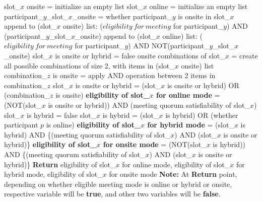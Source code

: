 \begin{algorithm}[H]
\begin{algorithmic}
            \State slot\_\(x\) onsite = initialize an empty list
            \State slot\_\(x\) online = initialize an empty list
                \State participant\_\(y\)\_slot\_\(x\)\_onsite = whether participant\_\(y\) is onsite in slot\_\(x\)
                \State append to (slot\_\(x\) onsite) list: (\(eligibility\ for\ meeting\) for participant\_\(y\)) AND (participant\_\(y\)\_slot\_\(x\)\_onsite)
                \State append to (slot\_\(x\) online) list: (\(eligibility\ for\ meeting\) for participant\_\(y\)) AND NOT(participant\_\(y\)\_slot\_\(x\)\_onsite)
            \EndFor
            \State slot\_\(x\) is onsite or hybrid = false
            \State onsite combinations of slot\_\(x\) = create all possible combinations of size 2, with items in (slot\_\(x\) onsite) list
                \State combination\_\(z\) is onsite = apply AND operation between 2 items in combination\_\(z\)
                \State slot\_\(x\) is onsite or hybrid = (slot\_\(x\) is onsite or hybrid) OR (combination\_\(z\) is onsite)
            \EndFor
            \State \textbf{eligibility of slot\_\(x\) for online mode} = (NOT(slot\_\(x\) is onsite or hybrid)) AND (meeting quorum satisfiability of slot\_\(x\))
            \State slot\_\(x\) is hybrid = false
                \State slot\_\(x\) is hybrid = (slot\_\(x\) is hybrid) OR (whether participant \(p\) is online)
            \EndFor
            \State \textbf{eligibility of slot\_\(x\) for hybrid mode} = (slot\_\(x\) is hybrid) AND \{(meeting quorum satisfiability of slot\_\(x\)) AND (slot\_\(x\) is onsite or hybrid)\}
            \State \textbf{eligibility of slot\_\(x\) for onsite mode} = (NOT(slot\_\(x\) is hybrid)) AND \{(meeting quorum satisfiability of slot\_\(x\)) AND (slot\_\(x\) is onsite or hybrid)\}
            \State \textbf{Return} eligibility of slot\_\(x\) for online mode, eligibility of slot\_\(x\) for hybrid mode, eligibility of slot\_\(x\) for onsite mode
            \State \textbf{Note:} At \textbf{Return} point, depending on whether eligible meeting mode is online or hybrid or onsite, respective variable will be \textbf{true}, and other two variables will be \textbf{false}.
        \EndFor
    \end{algorithmic}
\end{algorithm}
